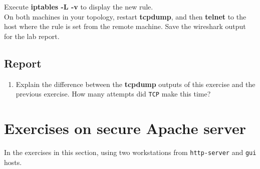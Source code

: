 \documentclass[10pt,a4paper]{article}
\numberwithin{equation}{section}
\numberwithin{figure}{section}
\numberwithin{table}{section}
\begin{document}
	Execute \textbf{iptables -L -v} to display the new rule.\\
	On both machines in your topology, restart \textbf{tcpdump}, and then \textbf{telnet} to the host where the rule is set from the remote machine. Save the wireshark output for the lab report.
	
	\subsection{Report}
	\begin{enumerate}
		\setlength{\itemindent}{0pt}
		\item Explain the difference between the \textbf{tcpdump} outputs of this exercise and the previous exercise. How many attempts did \texttt{TCP} make this time?
	\end{enumerate}

\section*{Exercises on secure Apache server}
	In the exercises in this section, using two workstations from \texttt{http-server} and \texttt{gui} hosts.
\end{document}
